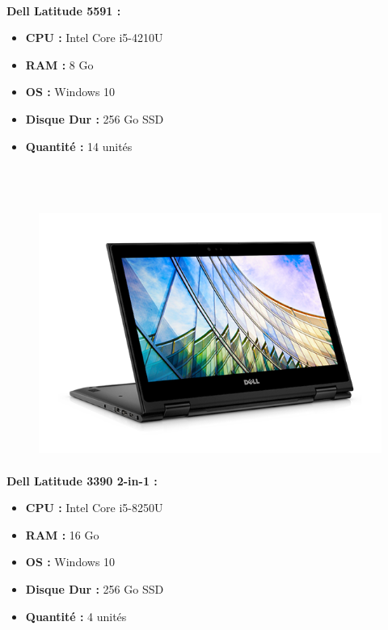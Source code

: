 \documentclass[11pt,a4paper,twoside]{article}
\begin{document}
\paragraph{}\textbf{Dell Latitude 5591 :} \\
\begin{itemize}
\item \textbf{CPU :} Intel Core i5-4210U
\item \textbf{RAM :} 8 Go
\item \textbf{OS :} Windows 10
\item \textbf{Disque Dur :} 256 Go SSD
\item \textbf{Quantité :} 14 unités
\\ \\ \\ \\
\end{itemize}
\begin{figure}
\includegraphics[scale=0.35]{Ressources/Materiel/3390.png}\vspace{-2cm}
\end{figure}
\paragraph{}\textbf{Dell Latitude 3390 2-in-1 :} \\
\begin{itemize}
\item \textbf{CPU :} Intel Core i5-8250U
\item \textbf{RAM :} 16 Go
\item \textbf{OS :} Windows 10
\item \textbf{Disque Dur :} 256 Go SSD
\item \textbf{Quantité :} 4 unités
\\ \\ \\ \\
\end{itemize}
\end{document}
